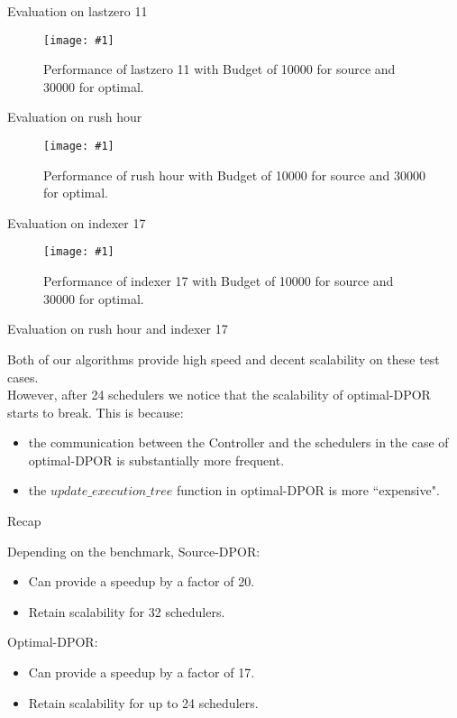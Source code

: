 \documentclass[9pt]{beamer}
\newcommand{\tracelong}[2]{
\begin{figure}[H]
\centering
\texttt{[image: \#1]}
\caption{#2}
\label{#2}
\end{figure}
}
\newcommand{\customGraph}[2]{
\begin{figure}[H]
\centering
\texttt{[image: \#1]}
\caption{#2}
\label{#2}
\end{figure}
}
\begin{document}
\iffalse
\begin{frame}{Evaluation on rush hour}


\tracelong{../img/rushhour.png}{Input of rush hour}


\end{frame}
\fi

\begin{frame}{Evaluation on lastzero 11}

\customGraph{../scripts/lastzero_11_10000_combo_time.png}{Performance of lastzero 11 with Budget of 10000 for source and 30000 for optimal.}


\end{frame}

\begin{frame}{Evaluation on rush hour}

\customGraph{../scripts/rush_hour_10000_combo_time.png}{Performance of rush hour with Budget of 10000 for source and 30000 for optimal.}


\end{frame}

\begin{frame}{Evaluation on indexer 17}

\customGraph{../scripts/indexer_17_10000_combo_time.png}{Performance of indexer 17 with Budget of 10000 for source and 30000 for optimal.}


\end{frame}

\begin{frame}{Evaluation on rush hour and indexer 17}

Both of our algorithms provide high speed and decent scalability on these test cases.
\\
However, after 24 schedulers we notice that the scalability of optimal-DPOR starts to break. This is because:

\begin{itemize}[<+->]
\item the communication between the Controller and the schedulers in the case of optimal-DPOR is substantially more frequent.
\item the $update\_execution\_tree$ function in optimal-DPOR is more ``expensive".
\end{itemize}

\end{frame}

\begin{frame}{Recap}

Depending on the benchmark, Source-DPOR:
\begin{itemize}[<+->]
\item Can provide a speedup by a factor of 20.
\item Retain scalability for 32 schedulers.
\end{itemize}
\pause
Optimal-DPOR:
\begin{itemize}[<+->]
\item Can provide a speedup by a factor of 17.
\item Retain scalability for up to 24 schedulers.
\end{itemize}


\end{frame}
\end{document}
